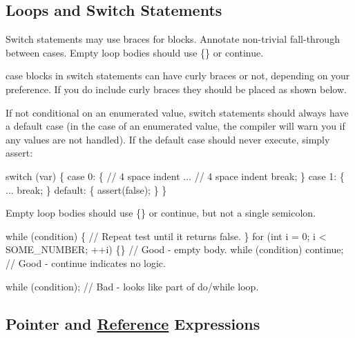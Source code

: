 \subsection*{Loops and Switch Statements}

Switch statements may use braces for blocks. Annotate non-\/trivial fall-\/through between cases. Empty loop bodies should use \{\} or continue.

case blocks in switch statements can have curly braces or not, depending on your preference. If you do include curly braces they should be placed as shown below.

If not conditional on an enumerated value, switch statements should always have a default case (in the case of an enumerated value, the compiler will warn you if any values are not handled). If the default case should never execute, simply assert\+:


\begin{DoxyCode}
\textcolor{keywordflow}{switch} (var) \{
    \textcolor{keywordflow}{case} 0: \{    \textcolor{comment}{// 4 space indent}
        ...      \textcolor{comment}{// 4 space indent}
        \textcolor{keywordflow}{break};
    \}
    \textcolor{keywordflow}{case} 1: \{
        ...
        \textcolor{keywordflow}{break};
    \}
    \textcolor{keywordflow}{default}: \{
       assert(\textcolor{keyword}{false});
    \}
\}
\end{DoxyCode}


Empty loop bodies should use {\ttfamily \{\}} or {\ttfamily continue}, but not a single semicolon.


\begin{DoxyCode}
\textcolor{keywordflow}{while} (condition) \{
    \textcolor{comment}{// Repeat test until it returns false.}
\}
\textcolor{keywordflow}{for} (\textcolor{keywordtype}{int} i = 0; i < SOME\_NUMBER; ++i) \{\}  \textcolor{comment}{// Good - empty body.}
\textcolor{keywordflow}{while} (condition) \textcolor{keywordflow}{continue};  \textcolor{comment}{// Good - continue indicates no logic.}

\textcolor{keywordflow}{while} (condition);  \textcolor{comment}{// Bad - looks like part of do/while loop.}
\end{DoxyCode}


\subsection*{Pointer and \hyperlink{structReference}{Reference} Expressions}

